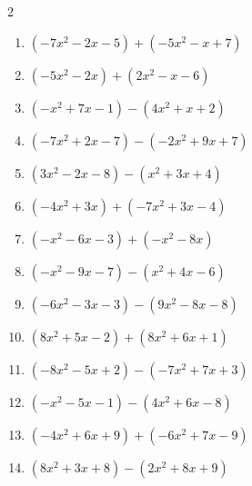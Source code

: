 \begin{multicols}{2}
\begin{enumerate}
  \item $(-7x^{2}-2x-5)+(-5x^{2}-x+7)$


  \item $(-5x^{2}-2x)+(2x^{2}-x-6)$


  \item $(-x^{2}+7x-1)-(4x^{2}+x+2)$


  \item $(-7x^{2}+2x-7)-(-2x^{2}+9x+7)$


  \item $(3x^{2}-2x-8)-(x^{2}+3x+4)$


  \item $(-4x^{2}+3x)+(-7x^{2}+3x-4)$


  \item $(-x^{2}-6x-3)+(-x^{2}-8x)$


\columnbreak %

  \item $(-x^{2}-9x-7)-(x^{2}+4x-6)$


  \item $(-6x^{2}-3x-3)-(9x^{2}-8x-8)$


  \item $(8x^{2}+5x-2)+(8x^{2}+6x+1)$


  \item $(-8x^{2}-5x+2)-(-7x^{2}+7x+3)$


  \item $(-x^{2}-5x-1)-(4x^{2}+6x-8)$


  \item $(-4x^{2}+6x+9)+(-6x^{2}+7x-9)$


  \item $(8x^{2}+3x+8)-(2x^{2}+8x+9)$


\end{enumerate}
\end{multicols}
